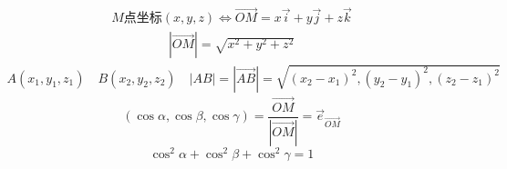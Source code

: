 	\begin{align}
	M\mbox{点坐标}(x,y,z)\Leftrightarrow\overrightarrow{OM}=x\overrightarrow{i}+y\overrightarrow{j}+z\overrightarrow{k}\label{Coordinate_representation_1}
\end{align}
\begin{align}
	|\overrightarrow{OM}|=\sqrt{x^2+y^2+z^2}\label{Coordinate_representation_2}
\end{align}
\begin{align}
A(x_1,y_1,z_1)\quad B(x_2,y_2,z_2)\quad |AB|=|\overrightarrow{AB}|=\sqrt{(x_2-x_1)^2,(y_2-y_1)^2,(z_2-z_1)^2}\label{Coordinate_representation_3}
\end{align}
\begin{equation}
	(\cos\alpha,\cos\beta,\cos\gamma)=\frac{\overrightarrow{OM}}{|\overrightarrow{OM}|}=\overrightarrow{e}_{\overrightarrow{OM}}\label{Coordinate_representation_4}
\end{equation}
\begin{equation}
	\cos^2\alpha+\cos^2\beta+\cos^2\gamma=1\label{Coordinate_representation_5}
\end{equation}